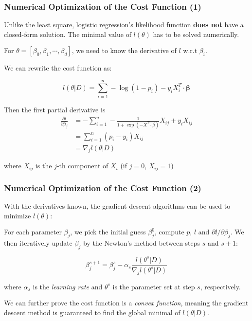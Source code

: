 \documentclass[10pt,aspectratio=169]{beamer}
\begin{document}
      \begin{frame}
        \frametitle{Numerical Optimization of the Cost Function (1)}
        Unlike the least square, logistic regression's likelihood
        function \textbf{does not} have a closed-form solution. The minimal
        value of $l(\theta)$ has to be solved numerically.

        For $\theta = [\beta_{0}, \beta_{1}, \cdots, \beta_{d}]$, we need to know the
        derivative of $l$ w.r.t $\beta_{i}$.

        We can rewrite the cost function as:

        \begin{equation*}
          l(\theta|D) = \sum_{i=1}^{n}  -\log (1 - p_{i}) - y_{i} X_{i}^{T}\cdot \mathbf{\beta}
        \end{equation*}

        Then the first partial derivative is
        \begin{align*}
          \frac{\partial l}{\partial \beta_{j}}
          &= -\sum_{i=1}^{n} -\frac{1}{1 + \exp(-X^{T}\cdot \beta)} X_{ij} + y_{i}X_{ij} \\
          &= \sum_{i=1}^{n} (p_{i} - y_{i})X_{ij}\\
          &= \nabla_{j} l(\theta | D)
        \end{align*}

        where $X_{ij}$ is the $j$-th component of $X_{i}$ (if $j=0$, $X_{ij} = 1$)
      \end{frame}

      \begin{frame}
        \frametitle{Numerical Optimization of the Cost Function (2)}
        With the derivatives known, the gradient descent
        algorithms can be used to minimize $l(\theta)$:

        For each parameter $\beta_{j}$, we pick the initial guess
        $\beta_{j}^{0}$, compute $p$, $l$ and
        $\partial l/\partial \beta_{j}$. We then iteratively update
        $\beta_{j}$ by the Newton's method between steps $s$ and $s+1$:

        \begin{equation*}
          \beta_{j}^{s+1} = \beta_{j}^{s} - \alpha_{s} \dfrac{l(\theta^{s}|D)}{\nabla_{j}l(\theta^{s} | D)}
        \end{equation*}

        where $\alpha_{s}$ is the \textit{learning rate} and $\theta^{s}$ is the parameter set at step $s$, respectively.

        We can further prove the cost function is a \textit{convex
          function}, meaning the gradient descent method is guaranteed
        to find the global minimal of $l(\theta | D)$.
        
      \end{frame}
\end{document}
